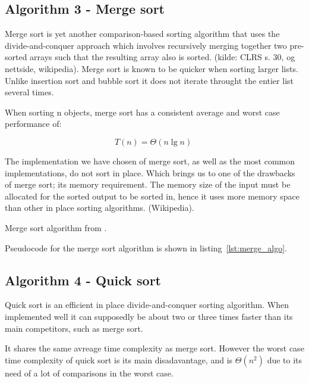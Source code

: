 \documentclass[sigconf, nonacm, natbib, screen, balance=False]{acmart}
\begin{document}
\subsection{Algorithm 3 - Merge sort}\label{sec:algo2}

Merge sort is yet another comparison-based sorting algorithm that uses the divide-and-conquer approach which involves recursively merging together two pre-sorted arrays such that the resulting array also is sorted. (kilde: CLRS s. 30, og nettside, wikipedia). Merge sort is known to be quicker when sorting larger lists. Unlike insertion sort and bubble sort it does not iterate throught the entier list several times. 

When sorting n objects, merge sort has a consistent average and worst case performance of: 

\begin{equation}
  T(n) = \Theta(n\lg n) \;  \label{eq:merge_sort_best}
\end{equation}

The implementation we have chosen of merge sort, as well as the most common implementations, do not sort in place. Which brings us to one of the drawbacks of merge sort; its memory requirement. The memory size of the input must be allocated for the sorted output to be sorted in, hence it uses more memory space than other in place sorting algorithms. (Wikipedia). 

\begin{listing}
  \caption{Merge sort algorithm from \citet[Ch.~2.1]{CLRS_2009}.}
  \label{lst:merge_algo}

  \begin{codebox}

  \end{codebox}
\end{listing}

Pseudocode for the merge sort algorithm is shown in listing~\ref{lst:merge_algo}. 

\subsection{Algorithm 4 - Quick sort}\label{sec:algo2}

Quick sort is an efficient in place divide-and-conquer sorting algorithm. When implemented well it can supposedly be about two or three times faster than its main competitors, such as merge sort. 

It shares the same avreage time complexity as merge sort. However the worst case time complexity of quick sort is its main disadavantage, and is $\Theta(n^2)$ due to its need of a lot of comparisons in the worst case.  
\end{document}
